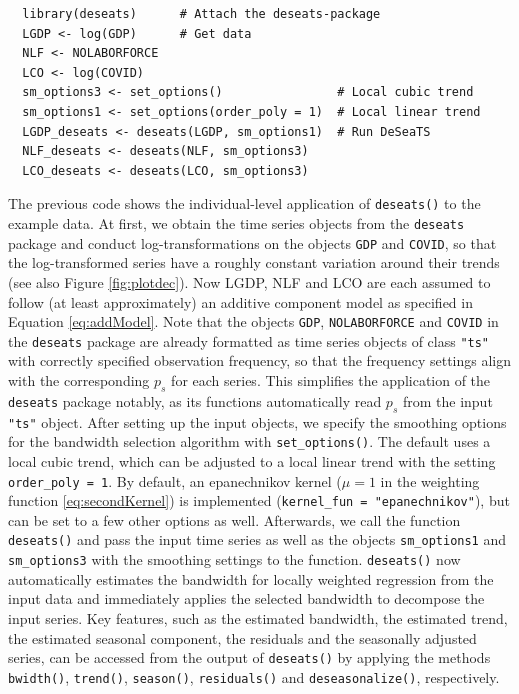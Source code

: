 \begin{verbatim}
  library(deseats)      # Attach the deseats-package
  LGDP <- log(GDP)      # Get data
  NLF <- NOLABORFORCE
  LCO <- log(COVID)
  sm_options3 <- set_options()                # Local cubic trend
  sm_options1 <- set_options(order_poly = 1)  # Local linear trend
  LGDP_deseats <- deseats(LGDP, sm_options1)  # Run DeSeaTS
  NLF_deseats <- deseats(NLF, sm_options3)
  LCO_deseats <- deseats(LCO, sm_options3)
\end{verbatim}

The previous code shows the individual-level application of \texttt{deseats()} to the example data. At first, we obtain the time series objects from the \texttt{deseats} package and conduct log-transformations on the objects \texttt{GDP} and \texttt{COVID}, so that the log-transformed series have a roughly constant variation around their trends (see also Figure \ref{fig:plotdec}). Now LGDP, NLF and LCO are each assumed to follow (at least approximately) an additive component model as specified in Equation \eqref{eq:addModel}. Note that the objects \texttt{GDP}, \texttt{NOLABORFORCE} and \texttt{COVID} in the \texttt{deseats} package are already formatted as time series objects of class \texttt{"ts"} with correctly specified observation frequency, so that the frequency settings align with the corresponding \(p_s\) for each series. This simplifies the application of the \texttt{deseats} package notably, as its functions automatically read \(p_s\) from the input \texttt{"ts"} object. After setting up the input objects, we specify the smoothing options for the bandwidth selection algorithm with \texttt{set\_options()}. The default uses a local cubic trend, which can be adjusted to a local linear trend with the setting \texttt{order\_poly\ =\ 1}. By default, an epanechnikov kernel (\(\mu = 1\) in the weighting function \eqref{eq:secondKernel}) is implemented (\texttt{kernel\_fun\ =\ "epanechnikov"}), but can be set to a few other options as well. Afterwards, we call the function \texttt{deseats()} and pass the input time series as well as the objects \texttt{sm\_options1} and \texttt{sm\_options3} with the smoothing settings to the function. \texttt{deseats()} now automatically estimates the bandwidth for locally weighted regression from the input data and immediately applies the selected bandwidth to decompose the input series. Key features, such as the estimated bandwidth, the estimated trend, the estimated seasonal component, the residuals and the seasonally adjusted series, can be accessed from the output of \texttt{deseats()} by applying the methods \texttt{bwidth()}, \texttt{trend()}, \texttt{season()}, \texttt{residuals()} and \texttt{deseasonalize()}, respectively.

